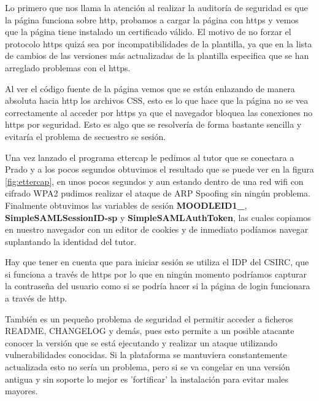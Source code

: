 Lo primero que nos llama la atención al realizar la auditoría de seguridad es que la página funciona sobre http, probamos a cargar la página con https y vemos que la página tiene instalado un certificado válido. El motivo de no forzar el protocolo https quizá sea por incompatibilidades de la plantilla, ya que en la lista de cambios de las versiones más actualizadas de la plantilla especifica que se han arreglado problemas con el https\cite{art_11}.

\bigskip
Al ver el código fuente de la página vemos que se están enlazando de manera absoluta hacia http los archivos CSS, esto es lo que hace que la página no se vea correctamente al acceder por https ya que el navegador bloquea las conexiones no https por seguridad. Esto es algo que se resolvería de forma bastante sencilla y evitaría el problema de secuestro se sesión.

\bigskip
Una vez lanzado el programa ettercap le pedimos al tutor que se conectara a Prado y a los pocos segundos obtuvimos el resultado que se puede ver en la figura \ref{fig:ettercap}, en unos pocos segundos y aun estando dentro de una red wifi con cifrado WPA2 pudimos realizar el ataque de ARP Spoofing sin ningún problema. Finalmente obtuvimos las variables de sesión \textbf{MOODLEID1\_}, \textbf{SimpleSAMLSessionID-sp} y \textbf{SimpleSAMLAuthToken}, las cuales copiamos en nuestro navegador con un editor de cookies y de inmediato podíamos navegar suplantando la identidad del tutor.

\bigskip
Hay que tener en cuenta que para iniciar sesión se utiliza el IDP del CSIRC, que si funciona a través de https por lo que en ningún momento podríamos capturar la contraseña del usuario como si se podría hacer si la página de login funcionara a través de http.

\bigskip
También es un pequeño problema de seguridad el permitir acceder a ficheros README, CHANGELOG y demás, pues esto permite a un posible atacante conocer la versión que se está ejecutando y realizar un ataque utilizando vulnerabilidades conocidas. Si la plataforma se mantuviera constantemente actualizada esto no sería un problema, pero si se va congelar en una versión antigua y sin soporte lo mejor es 'fortificar' la instalación para evitar males mayores.

